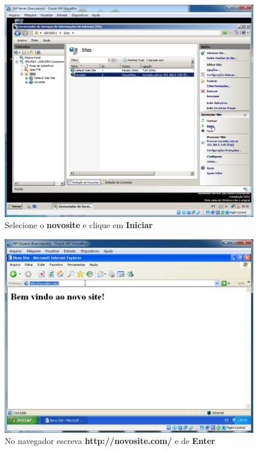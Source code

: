 \documentclass[10pt]{article}
\begin{document}
\begin{figure}[H]
    \centering
    \caption{Selecione o \textbf{novosite} e clique em \textbf{Iniciar}}
    \label{fig:5532043}
    \includegraphics[width=\linewidth]{images/IIS/criando_um_novo_site/043.png}
\end{figure}
\begin{figure}[H]
    \centering
    \caption{No navegador escreva \textbf{http://novosite.com/} e de \textbf{Enter}}
    \label{fig:5532044}
    \includegraphics[width=\linewidth]{images/IIS/criando_um_novo_site/044.png}
\end{figure}
\end{document}
